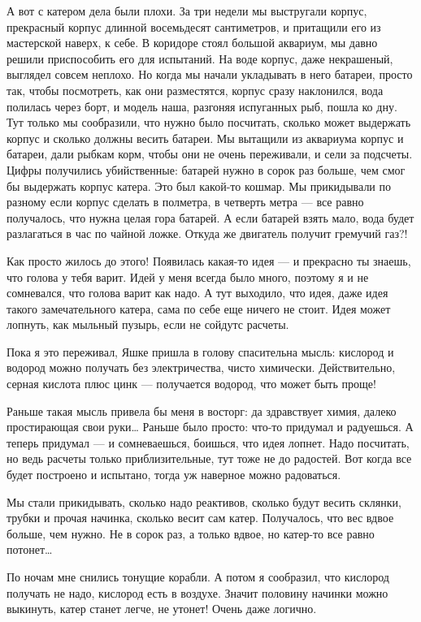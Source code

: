 А вот  с катером  дела были  плохи. За  три недели  мы выстругали  корпус,
прекрасный корпус  длинной восемьдесят  сантиметров,  и притащили  его  из
мастерской наверх, к  себе. В  коридоре стоял большой  аквариум, мы  давно
решили приспособить его  для испытаний. На  воде корпус, даже  некрашеный,
выглядел совсем неплохо.  Но когда  мы начали укладывать  в него  батареи,
просто  так,  чтобы   посмотреть,  как  они   разместятся,  корпус   сразу
наклонился, вода полилась через борт,  и модель наша, разгоняя  испуганных
рыб, пошла ко  дну. Тут только  мы сообразили, что  нужно было  посчитать,
сколько может  выдержать  корпус  и  сколько  должны  весить  батареи.  Мы
вытащили из аквариума  корпус и батареи,  дали рыбкам корм,  чтобы они  не
очень переживали,  и  сели  за подсчеты.  Цифры  получились  убийственные:
батарей нужно в сорок раз больше, чем смог бы выдержать корпус катера. Это
был какой-то  кошмар. Мы  прикидывали  по разному  если корпус  сделать  в
полметра, в четверть метра  — все равно получалось,  что нужна целая  гора
батарей. А если батарей взять мало, вода будет разлагаться в час по чайной
ложке. Откуда же двигатель получит гремучий газ?!

Как просто  жилось до  этого! Появилась  какая-то идея  — и  прекрасно  ты
знаешь, что голова у тебя варит. Идей у меня всегда было много, поэтому  я
и не сомневался, что голова варит как надо. А тут выходило, что идея, даже
идея такого замечательного катера, сама по себе еще ничего не стоит.  Идея
может лопнуть, как мыльный пузырь, если не сойдутс расчеты.

Пока я это переживал, Яшке пришла  в голову спасительна мысль: кислород  и
водород можно получать без электричества, чисто химически.  Действительно,
серная кислота плюс цинк — получается водород, что может быть проще!

Раньше такая мысль привела бы меня в восторг: да здравствует химия, далеко
простирающая свои руки… Раньше было просто: что-то придумал и радуешься. А
теперь  придумал  —  и  сомневаешься,  боишься,  что  идея  лопнет.   Надо
посчитать,  но  ведь  расчеты  только  приблизительные,  тут  тоже  не  до
радостей. Вот  когда все  будет построено  и испытано,  тогда уж  наверное
можно радоваться.

Мы  стали  прикидывать,  сколько  надо  реактивов,  сколько  будут  весить
склянки, трубки и прочая начинка, сколько весит сам катер. Получалось, что
вес вдвое больше, чем нужно. Не в  сорок раз, а только вдвое, но  катер-то
все равно потонет…

По ночам мне снились  тонущие корабли. А потом  я сообразил, что  кислород
получать не надо, кислород есть  в воздухе. Значит половину начинки  можно
выкинуть, катер станет легче, не утонет! Очень даже логично.

